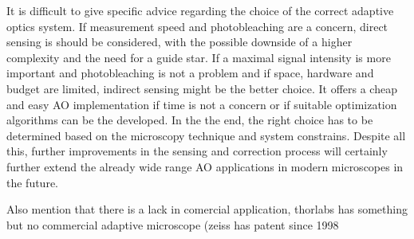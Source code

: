 \noindent It is difficult to give specific advice regarding the choice of the correct adaptive optics system. If measurement speed and photobleaching are a concern, direct sensing is should be considered, with the possible downside of a higher complexity and the need for a guide star. 
If a maximal signal intensity is more important and photobleaching is not a problem and if space, hardware and budget are limited, indirect sensing might be the better choice. It offers a cheap and easy AO implementation if time is not a concern or if suitable optimization algorithms can be the developed. In the the end, the right choice has to be  determined based on the microscopy technique and system constrains. Despite all this, further improvements in the sensing and correction process will certainly further extend the already wide range AO applications in modern microscopes in the future. 

Also mention that there is a lack in comercial application, thorlabs has something \cite{future_thorlabs}
but no commercial adaptive microscope (zeiss has patent since 1998~\cite{future_zeiss_patent}